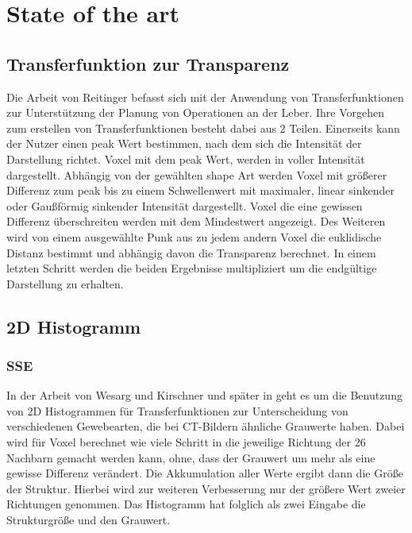 \documentclass{article}
\begin{document}
\section{State of the art}
\subsection{Transferfunktion zur Transparenz}

Die Arbeit von Reitinger \cite{reitinger2004user} befasst sich mit der Anwendung von Transferfunktionen zur Unterstützung der Planung von Operationen an der Leber. Ihre Vorgehen zum erstellen von Transferfunktionen besteht dabei aus 2 Teilen.
\newline
Einerseits kann der Nutzer einen peak Wert bestimmen, nach dem sich die Intensität der Darstellung richtet. Voxel mit dem peak Wert, werden in voller Intensität dargestellt. Abhängig von der gewählten shape Art werden Voxel mit größerer Differenz zum peak  bis zu einem Schwellenwert mit maximaler, linear sinkender oder Gaußförmig sinkender Intensität dargestellt. Voxel die eine gewissen Differenz überschreiten werden mit dem Mindestwert angezeigt.
\newline
Des Weiteren wird von einem ausgewählte Punk aus zu jedem andern Voxel die euklidische Distanz bestimmt und abhängig davon die Transparenz berechnet.
\newline
In einem letzten Schritt werden die beiden Ergebnisse multipliziert um die endgültige Darstellung zu erhalten.


\subsection{2D Histogramm}

\subsubsection{SSE}

In der Arbeit von Wesarg und Kirschner \cite{wesarg2009structure} und später in \cite{wesarg20102d} geht es um die Benutzung von 2D Histogrammen für Transferfunktionen zur Unterscheidung von verschiedenen Gewebearten, die bei CT-Bildern ähnliche Grauwerte haben.
\newline
Dabei wird für Voxel berechnet wie viele Schritt in die jeweilige Richtung der 26 Nachbarn gemacht werden kann, ohne, dass der Grauwert um mehr als eine gewisse Differenz verändert. Die Akkumulation aller Werte ergibt dann die Größe der Struktur. Hierbei wird zur weiteren Verbesserung nur der größere Wert zweier Richtungen genommen.
\newline
Das Histogramm hat folglich als zwei Eingabe die Strukturgröße und den Grauwert.
\end{document}
